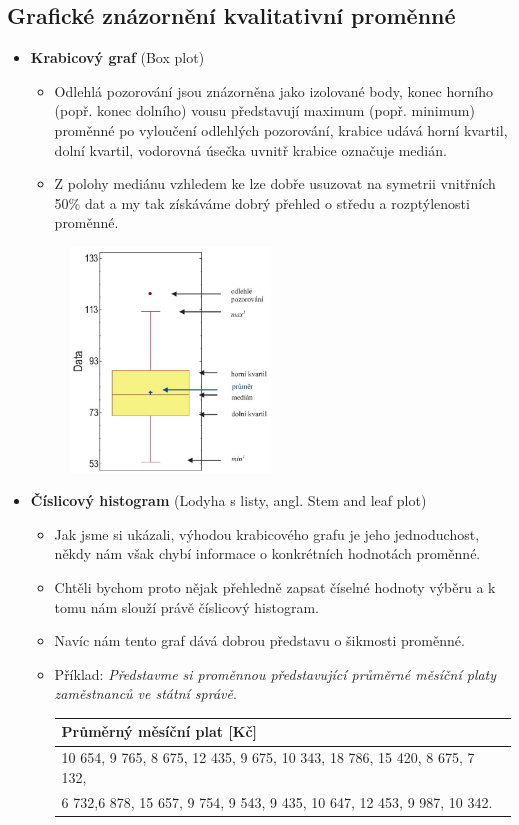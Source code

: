 \subsection{Grafické znázornění kvalitativní proměnné}
\begin{itemize}
	\item \textbf{Krabicový graf} (Box plot)
	\begin{itemize}
		\item Odlehlá pozorování jsou znázorněna jako izolované body, konec horního (popř. konec dolního) vousu představují maximum (popř. minimum) proměnné po vyloučení odlehlých pozorování, krabice udává horní kvartil,  dolní kvartil, vodorovná úsečka uvnitř krabice označuje medián.
		\item Z polohy mediánu vzhledem ke  lze dobře usuzovat na symetrii vnitřních 50\% dat a my tak získáváme dobrý přehled o středu a rozptýlenosti proměnné.
	\end{itemize}
				\begin{figure}[H]
				\centering
				\includegraphics[width=0.5\textwidth]{assets/13_box_plot}
				\end{figure}
	\item \textbf{Číslicový histogram} (Lodyha s listy, angl. Stem and leaf plot)
	\begin{itemize}
		\item Jak jsme si ukázali, výhodou krabicového grafu je jeho jednoduchost, někdy nám však chybí informace o konkrétních hodnotách proměnné. 
		\item Chtěli bychom proto nějak přehledně zapsat číselné hodnoty výběru a k tomu nám slouží právě číslicový histogram.
		\item Navíc nám tento graf dává dobrou představu o šikmosti proměnné.
		\item Příklad: \textit{Představme si proměnnou představující průměrné měsíční platy zaměstnanců ve státní správě}.
		\begin{table}[H]
	\centering
	\begin{tabular}{|l|}
		\hline
		\textbf{Průměrný měsíční plat [Kč]}                                \\ \hline
		10 654, 9 765, 8 675, 12 435, 9 675, 10 343, 18 786, 15 420, 8 675,	7 132, \\
		6 732,6 878, 15 657, 9 754, 9 543, 9 435, 10 647, 12 453, 9 987, 10 342.                                                                 \\ \hline


\end{tabular}
\end{table}
\end{itemize}
\end{itemize}
